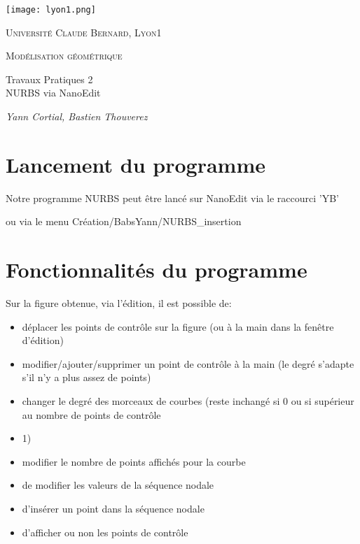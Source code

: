 \documentclass[10pt]{article}
\begin{document}
\begin{titlepage}
	\centering
	{\texttt{[image: lyon1.png]}\par}
	\vspace{.5cm}
	{\scshape\large Universit\'e Claude Bernard, Lyon1 \par}
	\vspace{2cm}
	{\scshape\LARGE Mod\'elisation g\'eom\'etrique \par}
	\vspace{1cm}
	{\huge\bfseries \Huge{Travaux Pratiques 2\\ NURBS via NanoEdit\par}}
	\vfill
	{\Large\itshape Yann Cortial, Bastien Thouverez\par}

\end{titlepage}



\section{Lancement du programme}
Notre programme NURBS peut \^etre lanc\'e sur NanoEdit via le raccourci 'YB'

ou via le menu Cr\'eation/BabsYann/NURBS\_insertion


\section{Fonctionnalit\'es du programme}

Sur la figure obtenue, via l'\'edition, il est possible de:
 \begin{itemize}
\item d\'eplacer les points de contr\^ole sur la figure (ou \`a la main dans la fen\^etre d'\'edition)
\item modifier/ajouter/supprimer un point de contr\^ole \`a la main (le degr\'e s'adapte s'il n'y a plus assez de points)
\item changer le degr\'e des morceaux de courbes (reste inchang\'e si 0 ou si sup\'erieur au nombre de points de contr\^ole \item 1)
\item modifier le nombre de points affich\'es pour la courbe
\item de modifier les valeurs de la s\'equence nodale
\item d'ins\'erer un point dans la s\'equence nodale
\item d'afficher ou non les points de contr\^ole
 
 \end{itemize}
\end{document}
